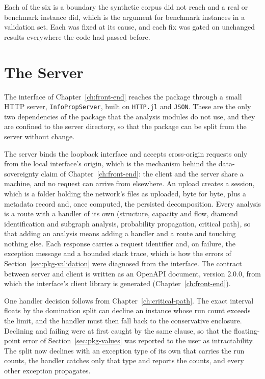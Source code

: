 \documentclass[12pt]{report}
\begin{document}
Each of the six is a boundary the synthetic corpus did not reach and a real or benchmark instance did, which is the argument for benchmark instances in a validation set. Each was fixed at its cause, and each fix was gated on unchanged results everywhere the code had passed before.

\section{The Server}
\label{sec:pkg-server}

The interface of Chapter~\ref{ch:front-end} reaches the package through a small HTTP server,
\texttt{InfoPropServer}, built on \texttt{HTTP.jl} and \texttt{JSON}. These are the only two
dependencies of the package that the analysis modules do not use, and they are confined to
the server directory, so that the package can be split from the server without change.

The server binds the loopback interface and accepts cross-origin requests only from the
local interface's origin, which is the mechanism behind the data-sovereignty claim of
Chapter~\ref{ch:front-end}: the client and the server share a machine, and no request can
arrive from elsewhere. An upload creates a session, which is a folder holding the network's
files as uploaded, byte for byte, plus a metadata record and, once computed, the persisted
decomposition. Every analysis is a route with a handler of its own (structure, capacity and
flow, diamond identification and subgraph analysis, probability propagation, critical
path), so that adding an analysis means adding a handler and a route and touching nothing
else. Each response carries a request identifier and, on failure, the exception message
and a bounded stack trace, which is how the errors of Section~\ref{sec:pkg-validation} were
diagnosed from the interface. The contract between server and client is written as an
OpenAPI document, version 2.0.0, from which the interface's client library is
generated (Chapter~\ref{ch:front-end}).

One handler decision follows from Chapter~\ref{ch:critical-path}. The exact interval floats
by the domination split can decline an instance whose run count exceeds the limit, and the
handler must then fall back to the conservative enclosure. Declining and failing were at
first caught by the same clause, so that the floating-point error of
Section~\ref{sec:pkg-values} was reported to the user as intractability. The split now
declines with an exception type of its own that carries the run counts, the handler catches
only that type and reports the counts, and every other exception propagates.
\end{document}

